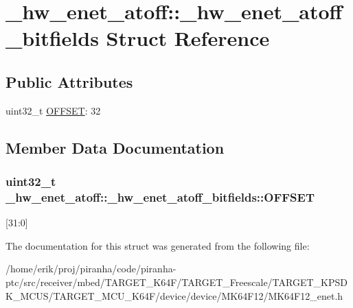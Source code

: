 \hypertarget{struct__hw__enet__atoff_1_1__hw__enet__atoff__bitfields}{}\section{\+\_\+hw\+\_\+enet\+\_\+atoff\+:\+:\+\_\+hw\+\_\+enet\+\_\+atoff\+\_\+bitfields Struct Reference}
\label{struct__hw__enet__atoff_1_1__hw__enet__atoff__bitfields}
\subsection*{Public Attributes}
\begin{DoxyCompactItemize}
\item 
uint32\+\_\+t \hyperlink{struct__hw__enet__atoff_1_1__hw__enet__atoff__bitfields_a65f0a73721fe9f931c3157614f563c73}{O\+F\+F\+S\+ET}\+: 32
\end{DoxyCompactItemize}


\subsection{Member Data Documentation}
\subsubsection[{\texorpdfstring{O\+F\+F\+S\+ET}{OFFSET}}]{\setlength{\rightskip}{0pt plus 5cm}uint32\+\_\+t \+\_\+hw\+\_\+enet\+\_\+atoff\+::\+\_\+hw\+\_\+enet\+\_\+atoff\+\_\+bitfields\+::\+O\+F\+F\+S\+ET}\hypertarget{struct__hw__enet__atoff_1_1__hw__enet__atoff__bitfields_a65f0a73721fe9f931c3157614f563c73}{}\label{struct__hw__enet__atoff_1_1__hw__enet__atoff__bitfields_a65f0a73721fe9f931c3157614f563c73}
\mbox{[}31\+:0\mbox{]} 

The documentation for this struct was generated from the following file\+:\begin{DoxyCompactItemize}
\item 
/home/erik/proj/piranha/code/piranha-\/ptc/src/receiver/mbed/\+T\+A\+R\+G\+E\+T\+\_\+\+K64\+F/\+T\+A\+R\+G\+E\+T\+\_\+\+Freescale/\+T\+A\+R\+G\+E\+T\+\_\+\+K\+P\+S\+D\+K\+\_\+\+M\+C\+U\+S/\+T\+A\+R\+G\+E\+T\+\_\+\+M\+C\+U\+\_\+\+K64\+F/device/device/\+M\+K64\+F12/M\+K64\+F12\+\_\+enet.\+h\end{DoxyCompactItemize}
